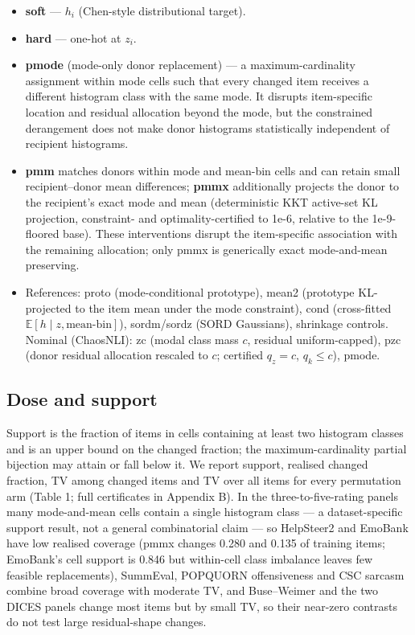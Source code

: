 \documentclass[10pt]{article}
\begin{document}
\begin{itemize}
\item
  \textbf{soft} --- \(h_i\) (Chen-style distributional target).
\item
  \textbf{hard} --- one-hot at \(z_i\).
\item
  \textbf{pmode} (mode-only donor replacement) --- a maximum-cardinality assignment within mode cells such that every changed item receives a different histogram class with the same mode. It disrupts item-specific location and residual allocation beyond the mode, but the constrained derangement does not make donor histograms statistically independent of recipient histograms.
\item
  \textbf{pmm} matches donors within mode and mean-bin cells and can retain small recipient--donor mean differences; \textbf{pmmx} additionally projects the donor to the recipient's exact mode and mean (deterministic KKT active-set KL projection, constraint- and optimality-certified to 1e-6, relative to the 1e-9-floored base). These interventions disrupt the item-specific association with the remaining allocation; only pmmx is generically exact mode-and-mean preserving.
\item
  References: proto (mode-conditional prototype), mean2 (prototype KL-projected to the item mean under the mode constraint), cond (cross-fitted \(\mathbb{E}[h \mid z, \text{mean-bin}]\)), sordm/sordz (SORD Gaussians), shrinkage controls. Nominal (ChaosNLI): zc (modal class mass \(c\), residual uniform-capped), pzc (donor residual allocation rescaled to \(c\); certified \(q_z = c\), \(q_k \le c\)), pmode.
\end{itemize}

\subsection{Dose and support}

Support is the fraction of items in cells containing at least two histogram classes and is an upper bound on the changed fraction; the maximum-cardinality partial bijection may attain or fall below it. We report support, realised changed fraction, TV among changed items and TV over all items for every permutation arm (Table 1; full certificates in Appendix B). In the three-to-five-rating panels many mode-and-mean cells contain a single histogram class --- a dataset-specific support result, not a general combinatorial claim --- so HelpSteer2 and EmoBank have low realised coverage (pmmx changes 0.280 and 0.135 of training items; EmoBank's cell support is 0.846 but within-cell class imbalance leaves few feasible replacements), SummEval, POPQUORN offensiveness and CSC sarcasm combine broad coverage with moderate TV, and Buse--Weimer and the two DICES panels change most items but by small TV, so their near-zero contrasts do not test large residual-shape changes.
\end{document}
